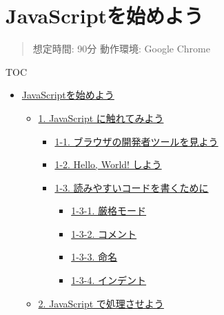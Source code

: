 \section{JavaScriptを始めよう}\label{javascriptux3092ux59cbux3081ux3088ux3046}

\begin{quote}
想定時間: 90分 動作環境: Google Chrome
\end{quote}

TOC

\begin{itemize}
\tightlist
\item
  \hyperref[javascriptux3092ux59cbux3081ux3088ux3046]{JavaScriptを始めよう}

  \begin{itemize}
  \tightlist
  \item
    \hyperref[1-javascript-ux306bux89e6ux308cux3066ux307fux3088ux3046]{1.
    JavaScript に触れてみよう}

    \begin{itemize}
    \tightlist
    \item
      \hyperref[1-1-ux30d6ux30e9ux30a6ux30b6ux306eux958bux767aux8005ux30c4ux30fcux30ebux3092ux898bux3088ux3046]{1-1.
      ブラウザの開発者ツールを見よう}
    \item
      \hyperref[1-2-hello-world-ux3057ux3088ux3046]{1-2. Hello, World!
      しよう}
    \item
      \hyperref[1-3-ux8aadux307fux3084ux3059ux3044ux30b3ux30fcux30c9ux3092ux66f8ux304fux305fux3081ux306b]{1-3.
      読みやすいコードを書くために}

      \begin{itemize}
      \tightlist
      \item
        \hyperref[1-3-1-ux53b3ux683cux30e2ux30fcux30c9]{1-3-1.
        厳格モード}
      \item
        \hyperref[1-3-2-ux30b3ux30e1ux30f3ux30c8]{1-3-2. コメント}
      \item
        \hyperref[1-3-3-ux547dux540d]{1-3-3. 命名}
      \item
        \hyperref[1-3-4-ux30a4ux30f3ux30c7ux30f3ux30c8]{1-3-4.
        インデント}
      \end{itemize}
    \end{itemize}
  \item
    \hyperref[2-javascript-ux3067ux51e6ux7406ux3055ux305bux3088ux3046]{2.
    JavaScript で処理させよう}


\end{itemize}
\end{itemize}
